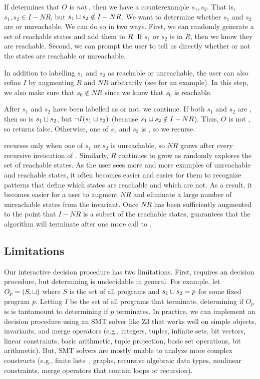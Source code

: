 If \IsIclosed{} determines that $O$ is \emph{not} , then we
have a counterexample $s_1, s_2$. That is, $s_1, s_2 \in I-NR$, but $s_1 \sqcup
s_2 \notin I-NR$. We want to determine whether $s_1$ and $s_2$ are
\sTIreachable{} or unreachable. We can do so in two ways.
%
First, we can randomly generate a set of reachable states and add them to $R$.
If $s_1$ or $s_2$ is in $R$, then we know they are reachable.
%
Second, we can prompt the user to tell us directly whether or not the states
are reachable or unreachable.

In addition to labelling $s_1$ and $s_2$ as reachable or unreachable, the user
can also refine $I$ by augmenting $R$ and $NR$ arbitrarily (see
 for an example). In this step, we also make
sure that $s_0 \notin NR$ since we know that $s_0$ is reachable.

After $s_1$ and $s_2$ have been labelled as \sTIreachable{} or not, we
continue. If both $s_1$ and $s_2$ are \sTIreachable{}, then so is $s_1 \sqcup
s_2$, but $\lnot I(s_1 \sqcup s_2)$ (because $s_1 \sqcup s_2 \notin I - NR$).
Thus, $O$ is not \sTIconfluent{}, so \Helper{} returns false. Otherwise, one of
$s_1$ and $s_2$ is \sTIunreachable{}, so we recurse.

\Helper{} recurses only when one of $s_1$ or $s_2$ is unreachable, so $NR$
grows after every recursive invocation of \Helper{}. Similarly, $R$ continues
to grow as \Helper{} randomly explores the set of reachable states. As the user
sees more and more examples of unreachable and reachable states, it often becomes
easier and easier for them to recognize patterns that define which states are
reachable and which are not. As a result, it becomes easier for a user to
augment $NR$ and eliminate a large number of unreachable states from the
invariant. Once $NR$ has been sufficiently augmented to the point that $I - NR$
is a subset of the reachable states, 
guarantees that the algorithm will terminate after one more call to \IsIclosed.

\subsection{Limitations}
Our interactive \invariantconfluence{} decision procedure has two
limitations. First,  requires an
\invariantclosure{} decision procedure, but determining \invariantclosure{} is
undecidable in general.
%
For example, let $O_p = (S, \sqcup)$ where $S$ is the set of all programs and
$s_1 \sqcup s_2 = p$ for some fixed program $p$. Letting $I$ be the set of all
programs that terminate, determining if $O_p$ is \Iclosed{} is tantamount to
determining if $p$ terminates.
%
In practice, we can implement an \invariantclosure{} decision procedure using
an SMT solver like Z3 that works well on simple objects, invariants, and merge
operators (e.g., integers, tuples, infinite sets, bit vectors, linear
constraints, basic arithmetic, tuple projection, basic set operations, bit
arithmetic). But, SMT solvers are mostly unable to analyze more complex
constructs (e.g., finite lists~\cite{kroning2009proposal}, graphs, recursive
algebraic data types, nonlinear constraints, merge operators that contain loops
or recursion).

